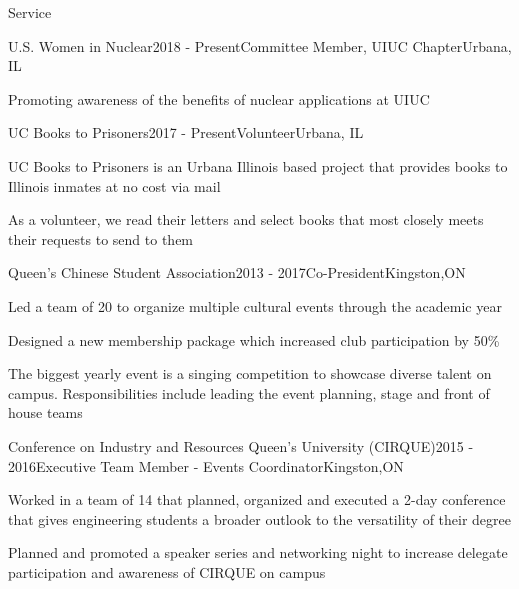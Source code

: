 \documentclass{resume2} %
\begin{document}

\begin{rSection}{Service}

	\begin{rSubsection}{U.S. Women in Nuclear}{2018 - Present}{Committee Member, UIUC Chapter}{Urbana, IL}
		\item Promoting awareness of the benefits of nuclear applications at UIUC 
	\end{rSubsection}

	\begin{rSubsection}{UC Books to Prisoners}{2017 - Present}{Volunteer}{Urbana, IL}
		\item UC Books to Prisoners is an Urbana Illinois based project that provides books to Illinois inmates at no cost via mail
		\item As a volunteer, we read their letters and select books that most closely meets their requests to send to them
	\end{rSubsection}
	
	\begin{rSubsection}{Queen's Chinese Student Association}{2013 - 2017}{Co-President}{Kingston,ON}
		\item Led a team of 20 to organize multiple cultural events through the academic year
		\item Designed a new membership package which increased club participation by 50\%
		\item The biggest yearly event is a singing competition to showcase diverse talent on campus. Responsibilities include leading the event planning, stage and front of house teams 
	\end{rSubsection}
\iffalse
	\begin{rSubsection}{Conference on Industry and Resources Queen's University (CIRQUE)}{2015 - 2016}{Executive Team Member - Events Coordinator}{Kingston,ON}
		\item Worked in a team of 14 that planned, organized and executed a 2-day conference that gives engineering students a broader outlook to the versatility of their degree
		\item Planned and promoted a speaker series and networking night to increase delegate participation and awareness of CIRQUE on campus
	\end{rSubsection}	


\end{rSection}
\end{document}
